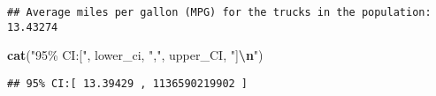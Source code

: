 \documentclass[
]{article}
\newenvironment{Shaded}{\begin{snugshade}}{\end{snugshade}}
\newcommand{\FunctionTok}[1]{\textcolor[rgb]{0.13,0.29,0.53}{\textbf{#1}}}
\newcommand{\NormalTok}[1]{#1}
\newcommand{\SpecialCharTok}[1]{\textcolor[rgb]{0.81,0.36,0.00}{\textbf{#1}}}
\newcommand{\StringTok}[1]{\textcolor[rgb]{0.31,0.60,0.02}{#1}}
\begin{document}
\begin{verbatim}
## Average miles per gallon (MPG) for the trucks in the population: 13.43274
\end{verbatim}

\begin{Shaded}
\begin{Highlighting}[]
\FunctionTok{cat}\NormalTok{(}\StringTok{"95\% CI:["}\NormalTok{, lower\_ci, }\StringTok{","}\NormalTok{, upper\_CI, }\StringTok{"]}\SpecialCharTok{\textbackslash{}n}\StringTok{"}\NormalTok{)}
\end{Highlighting}
\end{Shaded}

\begin{verbatim}
## 95% CI:[ 13.39429 , 1136590219902 ]
\end{verbatim}
\end{document}
